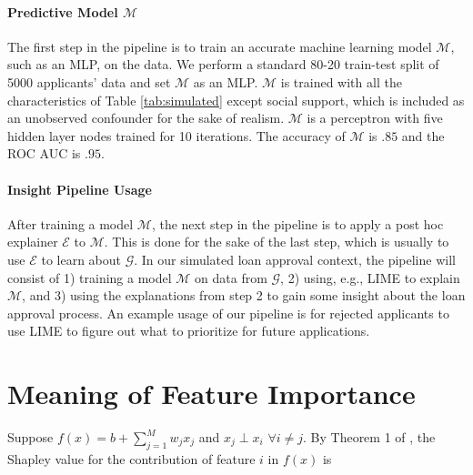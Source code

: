\documentclass[12pt]{article}    %
\begin{document}
\paragraph{Predictive Model $\mathcal{M}$}
The first step in the pipeline is to train an accurate machine learning model $\mathcal{M}$, such as an MLP, on the data. We perform a standard 80-20 train-test split of 5000 applicants' data and set $\mathcal{M}$ as an MLP. $\mathcal{M}$ is trained with all the characteristics of Table \ref{tab:simulated} except social support, which is included as an unobserved confounder for the sake of realism. $\mathcal{M}$ is a perceptron with five hidden layer nodes trained for 10 iterations. The accuracy of $\mathcal{M}$ is $.85$ and the ROC AUC is $.95$. 

\paragraph{Insight Pipeline Usage}
After training a model $\mathcal{M}$, the next step in the pipeline is to apply a post hoc explainer $\mathcal{E}$ to $\mathcal{M}$. This is done for the sake of the last step, which is usually to use $\mathcal{E}$ to learn about $\mathcal{G}$. In our simulated loan approval context, the pipeline will consist of 1) training a model $\mathcal{M}$ on data from $\mathcal{G}$, 2) using, e.g., LIME to explain $\mathcal{M}$, and 3) using the explanations from step 2 to gain some insight about the loan approval process. An example usage of our pipeline is for rejected applicants to use LIME to figure out what to prioritize for future applications.%



\section{Meaning of Feature Importance}

Suppose $f(x)=b+\sum_{j=1}^M w_j x_j$ and $x_j \perp x_i$ $\forall i \neq j$. By Theorem 1 of \citep{lundberg17shap}, the Shapley value for the contribution of feature $i$ in $f(x)$ is 
\end{document}

